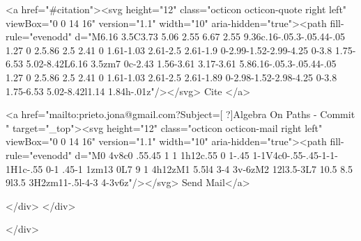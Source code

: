       <a  href="#citation"><svg height="12" class="octicon octicon-quote right left" viewBox="0 0 14 16" version="1.1" width="10" aria-hidden="true"><path fill-rule="evenodd" d="M6.16 3.5C3.73 5.06 2.55 6.67 2.55 9.36c.16-.05.3-.05.44-.05 1.27 0 2.5.86 2.5 2.41 0 1.61-1.03 2.61-2.5 2.61-1.9 0-2.99-1.52-2.99-4.25 0-3.8 1.75-6.53 5.02-8.42L6.16 3.5zm7 0c-2.43 1.56-3.61 3.17-3.61 5.86.16-.05.3-.05.44-.05 1.27 0 2.5.86 2.5 2.41 0 1.61-1.03 2.61-2.5 2.61-1.89 0-2.98-1.52-2.98-4.25 0-3.8 1.75-6.53 5.02-8.42l1.14 1.84h-.01z"/></svg> Cite
      </a>

      <a href="mailto:prieto.jona@gmail.com?Subject=[ ?]Algebra On Paths - Commit " target="_top"><svg height="12" class="octicon octicon-mail right left" viewBox="0 0 14 16" version="1.1" width="10" aria-hidden="true"><path fill-rule="evenodd" d="M0 4v8c0 .55.45 1 1 1h12c.55 0 1-.45 1-1V4c0-.55-.45-1-1-1H1c-.55 0-1 .45-1 1zm13 0L7 9 1 4h12zM1 5.5l4 3-4 3v-6zM2 12l3.5-3L7 10.5 8.5 9l3.5 3H2zm11-.5l-4-3 4-3v6z"/></svg> Send Mail</a>

    </div>
  </div>

</div>




